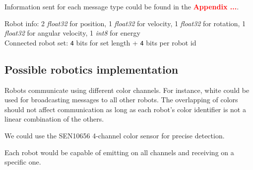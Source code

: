 \documentclass[../main.tex]{subfiles}
\begin{document}
Information sent for each message type could be found in the \textcolor{red}{\textbf{Appendix ...}}.

Robot info:
2 \textit{float32} for position, 1 \textit{float32} for velocity, 1 \textit{float32} for rotation, 1 \textit{float32} for angular velocity, 1 \textit{int8} for energy\\

Connected robot set:
\texttt{4} bits for set length + \texttt{4} bits per robot id

\subsection{Possible robotics implementation}

Robots communicate using different color channels. For instance, white could be used for broadcasting messages to all other robots. The overlapping of colors should not affect communication as long as each robot's color identifier is not a linear combination of the others.

We could use the SEN10656 4-channel color sensor for precise detection.

Each robot would be capable of emitting on all channels and receiving on a specific one.
\end{document}
